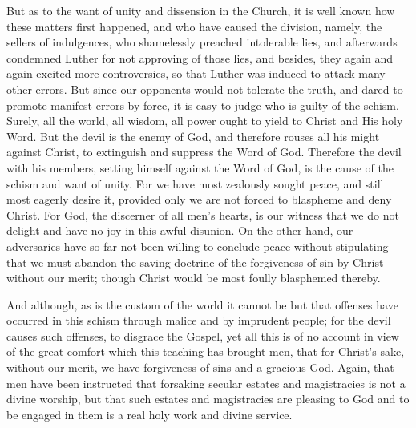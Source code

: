 But as to the want of unity and dissension in the Church, it is well
known how these matters first happened, and who have caused the
division, namely, the sellers of indulgences, who shamelessly
preached intolerable lies, and afterwards condemned Luther for not
approving of those lies, and besides, they again and again excited
more controversies, so that Luther was induced to attack many other
errors.  But since our opponents would not tolerate the truth, and
dared to promote manifest errors by force, it is easy to judge who is
guilty of the schism.  Surely, all the world, all wisdom, all power
ought to yield to Christ and His holy Word.  But the devil is the
enemy of God, and therefore rouses all his might against Christ, to
extinguish and suppress the Word of God.  Therefore the devil with
his members, setting himself against the Word of God, is the cause of
the schism and want of unity.  For we have most zealously sought
peace, and still most eagerly desire it, provided only we are not
forced to blaspheme and deny Christ.  For God, the discerner of all
men's hearts, is our witness that we do not delight and have no joy
in this awful disunion.  On the other hand, our adversaries have so
far not been willing to conclude peace without stipulating that we
must abandon the saving doctrine of the forgiveness of sin by Christ
without our merit; though Christ would be most foully blasphemed
thereby.

And although, as is the custom of the world it cannot be but that
offenses have occurred in this schism through malice and by imprudent
people; for the devil causes such offenses, to disgrace the Gospel,
yet all this is of no account in view of the great comfort which this
teaching has brought men, that for Christ's sake, without our merit,
we have forgiveness of sins and a gracious God.  Again, that men have
been instructed that forsaking secular estates and magistracies is
not a divine worship, but that such estates and magistracies are
pleasing to God and to be engaged in them is a real holy work and
divine service.

